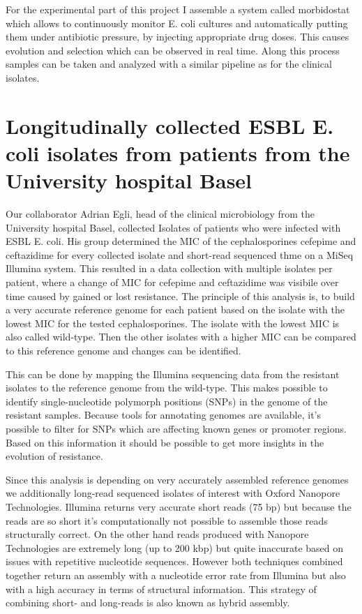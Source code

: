 For the experimental part of this project I assemble a system called morbidostat which allows to continuously monitor E. coli cultures and automatically putting them under antibiotic pressure, by injecting appropriate drug doses. This causes evolution and selection which can be observed in real time. Along this process samples can be taken and analyzed with a similar pipeline as for the clinical isolates.

\section{Longitudinally collected ESBL E. coli isolates from patients from the University hospital Basel}
Our collaborator Adrian Egli, head of the clinical microbiology from the University hospital Basel, collected Isolates of patients who were infected with ESBL E. coli. His group determined the MIC of the cephalosporines cefepime and ceftazidime for every collected isolate  and short-read sequenced thme on a MiSeq Illumina system.
This resulted in a data collection with multiple isolates per patient, where a change of MIC for cefepime and ceftazidime was visibile over time caused by gained or lost resistance. 
The principle of this analysis is, to build a very accurate reference genome for each patient based on the isolate with the lowest MIC for the tested cephalosporines. The isolate with the lowest MIC is also called wild-type. Then the other isolates with a higher MIC can be compared to this reference genome and changes can be identified. 

This can be done by mapping the Illumina sequencing data from the resistant isolates to the reference genome from the wild-type. 
This makes possible to identify single-nucleotide polymorph positions (SNPs) in the genome of the resistant samples. Because tools for annotating genomes are available, it's possible to filter for SNPs which are affecting known genes or promoter regions. Based on this information it should be possible to get more insights in the evolution of resistance. 

Since this analysis is depending on very accurately assembled reference genomes we additionally long-read sequenced isolates of interest with Oxford Nanopore Technologies. Illumina returns very accurate short reads (75 bp) but because the reads are so short it's computationally not possible to assemble those reads structurally correct. On the other hand reads produced with Nanopore Technologies are extremely long (up to 200 kbp) but quite inaccurate based on issues with repetitive nucleotide sequences. However both techniques combined together return an assembly with a nucleotide error rate from Illumina but also with a high accuracy in terms of structural information.  
This strategy of combining short- and long-reads is also known as hybrid assembly. 


